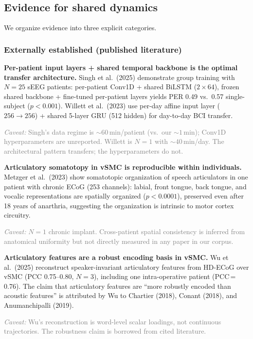 \documentclass[11pt,letterpaper]{article}
\newcommand{\caveat}[1]{\par\smallskip\noindent\textcolor{gray}{\textit{Caveat:} #1}\smallskip}
\begin{document}
\subsection{Evidence for shared dynamics}

We organize evidence into three explicit categories.

\subsubsection{Externally established (published literature)}

\textbf{Per-patient input layers + shared temporal backbone is the optimal transfer architecture.} Singh et al.\ (2025) demonstrate group training with $N{=}25$ sEEG patients: per-patient Conv1D + shared BiLSTM ($2{\times}64$), frozen shared backbone + fine-tuned per-patient layers yields PER 0.49 vs.\ 0.57 single-subject ($p{<}0.001$). Willett et al.\ (2023) use per-day affine input layer ($256{\to}256$) + shared 5-layer GRU (512 hidden) for day-to-day BCI transfer.

\caveat{Singh's data regime is ${\sim}60$\,min/patient (vs.\ our ${\sim}1$\,min); Conv1D hyperparameters are unreported. Willett is $N{=}1$ with ${\sim}40$\,min/day. The architectural pattern transfers; the hyperparameters do not.}

\textbf{Articulatory somatotopy in vSMC is reproducible within individuals.} Metzger et al.\ (2023) show somatotopic organization of speech articulators in one patient with chronic ECoG (253 channels): labial, front tongue, back tongue, and vocalic representations are spatially organized ($p{<}0.0001$), preserved even after 18 years of anarthria, suggesting the organization is intrinsic to motor cortex circuitry.

\caveat{$N{=}1$ chronic implant. Cross-patient spatial consistency is inferred from anatomical uniformity but not directly measured in any paper in our corpus.}

\textbf{Articulatory features are a robust encoding basis in vSMC.} Wu et al.\ (2025) reconstruct speaker-invariant articulatory features from HD-ECoG over vSMC (PCC 0.75--0.80, $N{=}3$), including one intra-operative patient (PCC\,=\,0.76). The claim that articulatory features are ``more robustly encoded than acoustic features'' is attributed by Wu to Chartier (2018), Conant (2018), and Anumanchipalli (2019).

\caveat{Wu's reconstruction is word-level scalar loadings, not continuous trajectories. The robustness claim is borrowed from cited literature.}
\end{document}
